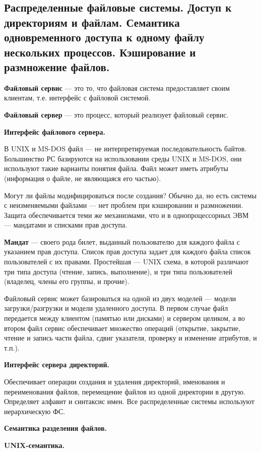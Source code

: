\subsection{Распределенные файловые системы. Доступ к директориям и файлам. Семантика одновременного доступа к одному файлу нескольких процессов. Кэширование и размножение файлов.}

\textbf{Файловый сервис} --- это то, что файловая система предоставляет своим клиентам, т.е. интерфейс с файловой системой.

\textbf{Файловый сервер} --- это процесс, который реализует файловый сервис.

\textbf{Интерфейс файлового сервера.}

В UNIX и MS-DOS файл --- не интерпретируемая последовательность байтов.
Большинство РС базируются на использовании среды UNIX и MS-DOS, они используют такие варианты понятия файла. 
Файл может иметь атрибуты (информация о файле, не являющаяся его частью).

Могут ли файлы модифицироваться после создания? Обычно да, но есть системы с неизменяемыми файлами --- нет проблем при кэшировании и размножении. 
Защита обеспечивается теми же механизмами, что и в однопроцессорных ЭВМ --- мандатами и списками прав доступа. 

\textbf{Мандат} --- своего рода билет, выданный пользователю для каждого файла с указанием прав доступа. 
Список прав доступа задает для каждого файла список пользователей с их правами. 
Простейшая --- UNIX схема, в которой различают три типа доступа (чтение, запись, выполнение), и три типа пользователей (владелец, члены его группы, и прочие).

Файловый сервис может базироваться на одной из двух моделей --- модели загрузки/разгрузки и модели удаленного доступа. 
В первом случае файл передается между клиентом (памятью или дисками) и сервером целиком, а во втором файл сервис обеспечивает множество операций (открытие, закрытие, чтение и запись части файла, сдвиг указателя, проверку и изменение атрибутов, и т.п.).

\textbf{Интерфейс сервера директорий.}

Обеспечивает операции создания и удаления директорий, именования и переименования файлов, перемещение файлов из одной директории в другую. 
Определяет алфавит и синтаксис имен. 
Все распределенные системы используют иерархическую ФС.

\textbf{Семантика разделения файлов.}

\textbf{UNIX-семантика.}

